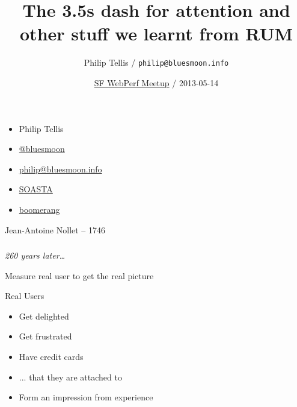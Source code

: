 \documentclass{beamer}
\author{Philip Tellis / \texttt{philip@bluesmoon.info}}
\title{The 3.5s dash for attention and other stuff we learnt from RUM}
\date{\href{http://www.meetup.com/SF-Web-Performance-Group/events/112412102/}{SF WebPerf Meetup} / 2013-05-14}
\newcommand{\innersplash}[1]{
  \begin{center}
    \Large \textrm{\textit{ #1 } }
  \end{center}
}
\newcommand{\splashslide}[2][{}]{
  \begin{frame}
  \frametitle{#1}
  \innersplash{#2}
  \end{frame}
}
\begin{document}
\begin{frame}
  \begin{itemize}
  \item Philip Tellis
  \item \href{http://twitter.com/bluesmoon}{@bluesmoon}
  \item \href{http://bluesmoon.info/}{philip@bluesmoon.info}
  \item \href{http://www.soasta.com/}{SOASTA}
  \item \href{http://lognormal.github.com/boomerang/doc/}{boomerang}
  \end{itemize}
\end{frame}

\begin{frame}
  \titlepage
\end{frame}

\begin{frame}{Jean-Antoine Nollet -- 1746}
\end{frame}

\splashslide{260 years later\ldots}


\begin{frame}{Measure real user to get the real picture}
\end{frame}

\begin{frame}{Real Users}
   {
    \begin{block}{}
      \begin{itemize}
        \item Get delighted
        \item<3-> Get frustrated
        \item<4-> Have credit cards
        \item<5-> ... that they are attached to
        \item<6-> Form an impression from experience
      \end{itemize}
    \end{block}
  }
\end{frame}
\end{document}
